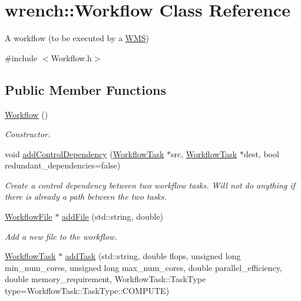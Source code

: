 \hypertarget{classwrench_1_1_workflow}{}\section{wrench\+:\+:Workflow Class Reference}
\label{classwrench_1_1_workflow}


A workflow (to be executed by a \hyperlink{classwrench_1_1_w_m_s}{W\+MS})  




{\ttfamily \#include $<$Workflow.\+h$>$}

\subsection*{Public Member Functions}
\begin{DoxyCompactItemize}
\item 
\mbox{\label{classwrench_1_1_workflow_a8447e0cbd59b4874bf47f8e2480a5a4d}} 
\hyperlink{classwrench_1_1_workflow_a8447e0cbd59b4874bf47f8e2480a5a4d}{Workflow} ()
\begin{DoxyCompactList}\small\item\em Constructor. \end{DoxyCompactList}\item 
void \hyperlink{classwrench_1_1_workflow_a1249e2430c541344d622d75519e4851b}{add\+Control\+Dependency} (\hyperlink{classwrench_1_1_workflow_task}{Workflow\+Task} $\ast$src, \hyperlink{classwrench_1_1_workflow_task}{Workflow\+Task} $\ast$dest, bool redundant\+\_\+dependencies=false)
\begin{DoxyCompactList}\small\item\em Create a control dependency between two workflow tasks. Will not do anything if there is already a path between the two tasks. \end{DoxyCompactList}\item 
\hyperlink{classwrench_1_1_workflow_file}{Workflow\+File} $\ast$ \hyperlink{classwrench_1_1_workflow_a0e1f7dc16f875f18c0990e6bd1843932}{add\+File} (std\+::string, double)
\begin{DoxyCompactList}\small\item\em Add a new file to the workflow. \end{DoxyCompactList}\item 
\hyperlink{classwrench_1_1_workflow_task}{Workflow\+Task} $\ast$ \hyperlink{classwrench_1_1_workflow_aa19c92f95eaf58aed7924adb426d01bf}{add\+Task} (std\+::string, double flops, unsigned long min\+\_\+num\+\_\+cores, unsigned long max\+\_\+num\+\_\+cores, double parallel\+\_\+efficiency, double memory\+\_\+requirement, Workflow\+Task\+::\+Task\+Type type=Workflow\+Task\+::\+Task\+Type\+::\+C\+O\+M\+P\+U\+TE)

\end{DoxyCompactItemize}
